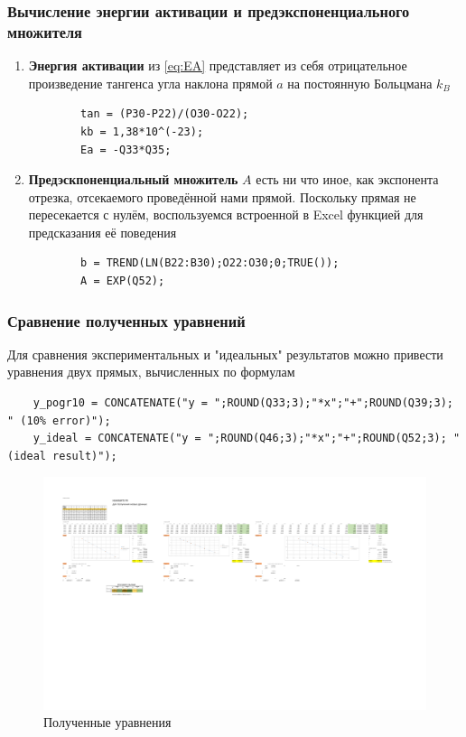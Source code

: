 \documentclass[14pt,a4paper]{extarticle}
\begin{document}
\subsubsection{Вычисление энергии активации и предэкспоненциального множителя}
\begin{enumerate}
	\item \textbf{Энергия активации} из \eqref{eq:EA} представляет из себя отрицательное произведение тангенса угла наклона прямой $a$ на постоянную Больцмана $k_B$
	\begin{lstlisting}
		tan = (P30-P22)/(O30-O22);
		kb = 1,38*10^(-23);
		Ea = -Q33*Q35;
\end{lstlisting}
	\item \textbf{Предэскпоненциальный множитель} $A$ есть ни что иное, как экспонента отрезка, отсекаемого проведённой нами прямой. Поскольку прямая не пересекается с нулём, воспользуемся встроенной в Excel функцией для предсказания её поведения
	\begin{lstlisting}
		b = TREND(LN(B22:B30);O22:O30;0;TRUE());
		A = EXP(Q52);
\end{lstlisting}
\end{enumerate}
\subsubsection{Сравнение полученных уравнений}
Для сравнения экспериментальных и "идеальных" результатов можно привести уравнения двух прямых, вычисленных по формулам
\begin{lstlisting}
	y_pogr10 = CONCATENATE("y = ";ROUND(Q33;3);"*x";"+";ROUND(Q39;3); " (10% error)");
	y_ideal = CONCATENATE("y = ";ROUND(Q46;3);"*x";"+";ROUND(Q52;3); " (ideal result)");
\end{lstlisting}
\begin{figure}[H]
	\centering
	\includegraphics[trim=230 385 716 217, clip, width=\textwidth]{results.pdf}\caption{Полученные уравнения}\label{fig:uravn}
\end{figure}
\end{document}
